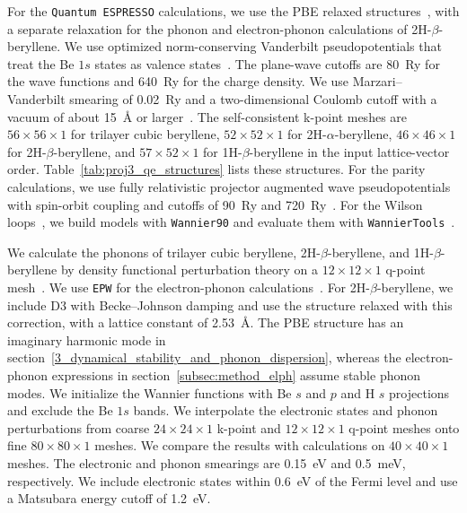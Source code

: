 For the \texttt{Quantum ESPRESSO} calculations, we use the PBE relaxed structures~\cite{giannozzi2017advanced,giannozzi2009quantum}, with a separate relaxation for the phonon and electron-phonon calculations of 2H-$\beta$-beryllene.
We use optimized norm-conserving Vanderbilt pseudopotentials that treat the Be $1s$ states as valence states~\cite{hamann2013optimized}.
The plane-wave cutoffs are \qty{80}{Ry} for the wave functions and \qty{640}{Ry} for the charge density.
We use Marzari--Vanderbilt smearing of \qty{0.02}{Ry} and a two-dimensional Coulomb cutoff with a vacuum of about \qty{15}{\angstrom} or larger~\cite{marzari1999thermal,sohier2017density}.
The self-consistent k-point meshes are $56 \times 56 \times 1$ for trilayer cubic beryllene, $52 \times 52 \times 1$ for 2H-$\alpha$-beryllene, $46 \times 46 \times 1$ for 2H-$\beta$-beryllene, and $57 \times 52 \times 1$ for 1H-$\beta$-beryllene in the input lattice-vector order.
Table~\ref{tab:proj3_qe_structures} lists these structures.
For the parity calculations, we use fully relativistic projector augmented wave pseudopotentials with spin-orbit coupling and cutoffs of \qty{90}{Ry} and \qty{720}{Ry}~\cite{dalcorso2014pseudopotentials}.
For the Wilson loops~\cite{yu2011equivalent}, we build models with \texttt{Wannier90} and evaluate them with \texttt{WannierTools}~\cite{pizzi2020wannier90,wu2018wanniertools}.

We calculate the phonons of trilayer cubic beryllene, 2H-$\beta$-beryllene, and 1H-$\beta$-beryllene by density functional perturbation theory on a $12 \times 12 \times 1$ q-point mesh~\cite{baroni2001phonons}.
We use \texttt{EPW} for the electron-phonon calculations~\cite{lee2023electron,giustino2007electron}.
For 2H-$\beta$-beryllene, we include D3 with Becke--Johnson damping and use the structure relaxed with this correction, with a lattice constant of \qty{2.53}{\angstrom}.
The PBE structure has an imaginary harmonic mode in section~\ref{3_dynamical_stability_and_phonon_dispersion}, whereas the electron-phonon expressions in section~\ref{subsec:method_elph} assume stable phonon modes.
We initialize the Wannier functions with Be $s$ and $p$ and H $s$ projections and exclude the Be $1s$ bands.
We interpolate the electronic states and phonon perturbations from coarse $24 \times 24 \times 1$ k-point and $12 \times 12 \times 1$ q-point meshes onto fine $80 \times 80 \times 1$ meshes.
We compare the results with calculations on $40 \times 40 \times 1$ meshes.
The electronic and phonon smearings are \qty{0.15}{\electronvolt} and \qty{0.5}{\milli\electronvolt}, respectively.
We include electronic states within \qty{0.6}{\electronvolt} of the Fermi level and use a Matsubara energy cutoff of \qty{1.2}{\electronvolt}.


